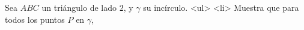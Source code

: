 Sea $ABC$ un triángulo de lado $2$, y $\gamma$ su incírculo. 
<ul>
<li> Muestra que para todos los puntos $P$ en $\gamma$, 